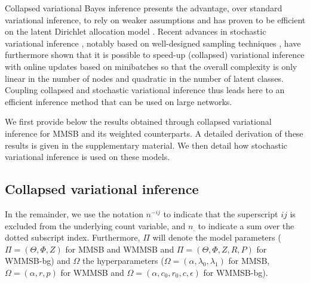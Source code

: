 Collapsed variational Bayes inference presents the advantage, over standard variational inference, to rely on weaker assumptions and has proven to be efficient on the latent Dirichlet allocation model \cite{teh2006collapsed}. Recent advances in stochastic variational inference \cite{hoffman2013stochastic}, notably based on well-designed sampling techniques \cite{gopalan2013efficient,kim2013efficient}, have furthermore shown that it is possible to speed-up (collapsed) variational inference with online updates based on minibatches so that the overall complexity is only linear in the number of nodes and quadratic in the number of latent classes. Coupling collapsed and stochastic variational inference thus leads here to an efficient inference method that can be used on large networks.

We first provide below the results obtained through collapsed variational inference for MMSB and its weighted counterparts. A detailed derivation of these results is given in the supplementary material. We then detail how stochastic variational inference is used on these models.

\subsection{Collapsed variational inference}

In the remainder, we use the notation $n^{-ij}$ to indicate that the superscript $ij$ is excluded from the underlying count variable, and $n_{\bm{.}}$ to indicate a sum over the dotted subscript index. Furthermore, $\Pi$ will denote the model parameters ($\Pi = (\Theta,\Phi,Z)$ for MMSB and WMMSB and $\Pi = (\Theta,\Phi,Z,R,P)$ for WMMSB-bg) and $\Omega$ the hyperparameters ($\Omega = (\alpha,\lambda_0,\lambda_1)$ for MMSB, $\Omega = (\alpha,r,p)$ for WMMSB and $\Omega = (\alpha, c_0, r_0, c, \epsilon)$ for WMMSB-bg). 

